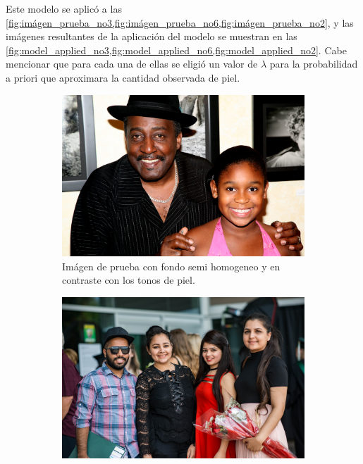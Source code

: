 Este modelo se aplicó a las \cref{fig:imágen_prueba_no3,fig:imágen_prueba_no6,fig:imágen_prueba_no2}, y las imágenes resultantes de la aplicación del modelo se muestran en las \cref{fig:model_applied_no3,fig:model_applied_no6,fig:model_applied_no2}. Cabe mencionar que para cada una de ellas se eligió un valor de $\lambda$ para la probabilidad a priori que aproximara la cantidad observada de piel.
\begin{figure}[ht!]
    \centering
    \begin{subfigure}[t]{0.4\textwidth}
        \centering
        \includegraphics[width=\textwidth]{../figures/image3/image_03.png}
        \caption{Imágen de prueba con fondo semi homogeneo y en contraste con los tonos de piel.}
        \label{fig:imágen_prueba_no3}
    \end{subfigure}
    \hspace{1cm}
    \begin{subfigure}[t]{0.4\textwidth}
        \centering
        \includegraphics[width=\textwidth]{../figures/image6/image_06.png}

\end{subfigure}
\end{figure}
